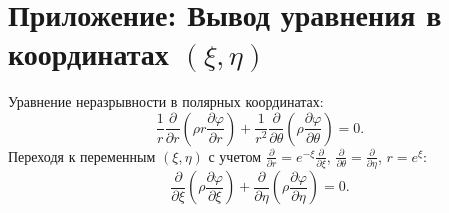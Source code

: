 \documentclass[a4paper,12pt]{article}
\begin{document}
	\appendix
	\section{Приложение: Вывод уравнения в координатах $(\xi, \eta)$}	
	Уравнение неразрывности в полярных координатах:
	\[
	\frac{1}{r} \frac{\partial}{\partial r} \left( \rho r \frac{\partial \varphi}{\partial r} \right) + \frac{1}{r^2} \frac{\partial}{\partial \theta} \left( \rho \frac{\partial \varphi}{\partial \theta} \right) = 0.
	\]
	Переходя к переменным $(\xi, \eta)$ с учетом $\frac{\partial}{\partial r} = e^{-\xi} \frac{\partial}{\partial \xi}$, $\frac{\partial}{\partial \theta} = \frac{\partial}{\partial \eta}$, $r = e^{\xi}$:
	\[
	\frac{\partial}{\partial \xi} \left( \rho \frac{\partial \varphi}{\partial \xi} \right) + \frac{\partial}{\partial \eta} \left( \rho \frac{\partial \varphi}{\partial \eta} \right) = 0.
	\]
\end{document}
